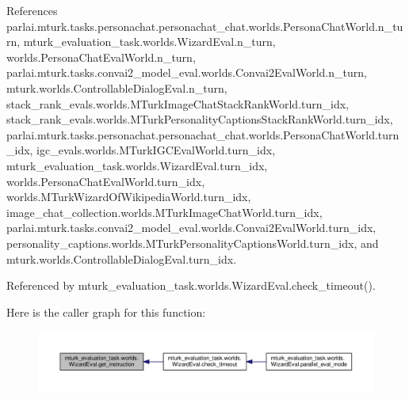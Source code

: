 References parlai.\+mturk.\+tasks.\+personachat.\+personachat\+\_\+chat.\+worlds.\+Persona\+Chat\+World.\+n\+\_\+turn, mturk\+\_\+evaluation\+\_\+task.\+worlds.\+Wizard\+Eval.\+n\+\_\+turn, worlds.\+Persona\+Chat\+Eval\+World.\+n\+\_\+turn, parlai.\+mturk.\+tasks.\+convai2\+\_\+model\+\_\+eval.\+worlds.\+Convai2\+Eval\+World.\+n\+\_\+turn, mturk.\+worlds.\+Controllable\+Dialog\+Eval.\+n\+\_\+turn, stack\+\_\+rank\+\_\+evals.\+worlds.\+M\+Turk\+Image\+Chat\+Stack\+Rank\+World.\+turn\+\_\+idx, stack\+\_\+rank\+\_\+evals.\+worlds.\+M\+Turk\+Personality\+Captions\+Stack\+Rank\+World.\+turn\+\_\+idx, parlai.\+mturk.\+tasks.\+personachat.\+personachat\+\_\+chat.\+worlds.\+Persona\+Chat\+World.\+turn\+\_\+idx, igc\+\_\+evals.\+worlds.\+M\+Turk\+I\+G\+C\+Eval\+World.\+turn\+\_\+idx, mturk\+\_\+evaluation\+\_\+task.\+worlds.\+Wizard\+Eval.\+turn\+\_\+idx, worlds.\+Persona\+Chat\+Eval\+World.\+turn\+\_\+idx, worlds.\+M\+Turk\+Wizard\+Of\+Wikipedia\+World.\+turn\+\_\+idx, image\+\_\+chat\+\_\+collection.\+worlds.\+M\+Turk\+Image\+Chat\+World.\+turn\+\_\+idx, parlai.\+mturk.\+tasks.\+convai2\+\_\+model\+\_\+eval.\+worlds.\+Convai2\+Eval\+World.\+turn\+\_\+idx, personality\+\_\+captions.\+worlds.\+M\+Turk\+Personality\+Captions\+World.\+turn\+\_\+idx, and mturk.\+worlds.\+Controllable\+Dialog\+Eval.\+turn\+\_\+idx.



Referenced by mturk\+\_\+evaluation\+\_\+task.\+worlds.\+Wizard\+Eval.\+check\+\_\+timeout().

Here is the caller graph for this function\+:
\nopagebreak
\begin{figure}[H]
\begin{center}
\leavevmode
\includegraphics[width=350pt]{classmturk__evaluation__task_1_1worlds_1_1WizardEval_aca4ed4e6a2e6aefb9f7cf9964b325212_icgraph}
\end{center}
\end{figure}
\mbox{\label{classmturk__evaluation__task_1_1worlds_1_1WizardEval_ad30c9575f816b5905836d78d35ac135e}} 
